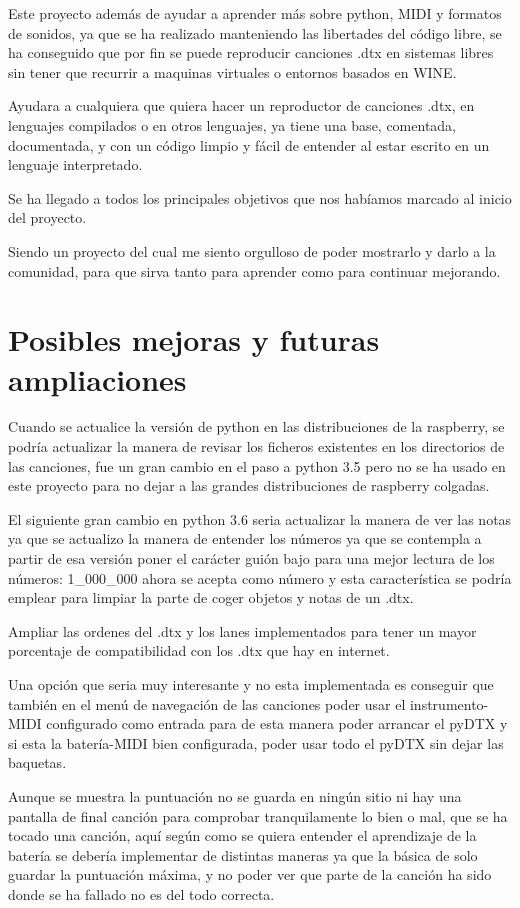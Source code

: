 \documentclass[a4paper,11pt,oneside]{book}
\begin{document}
Este proyecto además de ayudar a aprender más sobre python, MIDI y formatos de sonidos, ya que se ha realizado manteniendo las libertades del código libre, se ha conseguido que por fin se puede reproducir canciones .dtx en sistemas libres sin tener que recurrir a maquinas virtuales o entornos basados en WINE.

Ayudara a cualquiera que quiera hacer un reproductor de canciones .dtx, en lenguajes compilados o en otros lenguajes, ya tiene una base, comentada, documentada, y con un código limpio y fácil de entender al estar escrito en un lenguaje interpretado.

Se ha llegado a todos los principales objetivos que nos habíamos marcado al inicio del proyecto.

Siendo un proyecto del cual me siento orgulloso de poder mostrarlo y darlo a la comunidad, para que sirva tanto para aprender como para continuar mejorando.

\section{Posibles mejoras y futuras ampliaciones}


Cuando se actualice la versión de python en las distribuciones de la raspberry, se podría actualizar la manera de revisar los ficheros existentes en los directorios de las canciones, fue un gran cambio en el paso a python 3.5 pero no se ha usado en este proyecto para no dejar a las grandes distribuciones de raspberry colgadas.

El siguiente gran cambio en python 3.6 seria actualizar la manera de ver las notas ya que se actualizo la manera de entender los números ya que se contempla a partir de esa versión poner el carácter guión bajo para una mejor lectura de los números: 1\_000\_000 ahora se acepta como número y esta característica se podría emplear para limpiar la parte de coger objetos y notas de un .dtx.

Ampliar las ordenes del .dtx y los lanes implementados para tener un mayor porcentaje de compatibilidad con los .dtx que hay en internet.

Una opción que seria muy interesante y no esta implementada es conseguir que también en el menú de navegación de las canciones poder usar el instrumento-MIDI configurado como entrada para de esta manera poder arrancar el pyDTX y si esta la batería-MIDI bien configurada, poder usar todo el pyDTX sin dejar las baquetas.

Aunque se muestra la puntuación no se guarda en ningún sitio ni hay una pantalla de final canción para comprobar tranquilamente lo bien o mal, que se ha tocado una canción, aquí según como se quiera entender el aprendizaje de la batería se debería implementar de distintas maneras ya que la básica de solo guardar la puntuación máxima, y no poder ver que parte de la canción ha sido donde se ha fallado no es del todo correcta.
\end{document}
